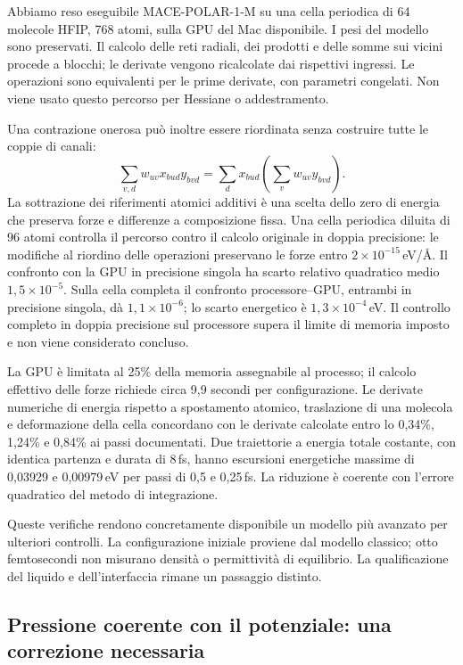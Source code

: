 \documentclass[11pt,reqno]{amsart}
\numberwithin{equation}{section}
\begin{document}
Abbiamo reso eseguibile MACE-POLAR-1-M su una cella periodica
di 64 molecole HFIP, 768 atomi, sulla GPU del Mac disponibile.
I pesi del modello sono preservati. Il calcolo delle reti radiali,
dei prodotti e delle somme sui vicini procede a blocchi;
le derivate vengono ricalcolate dai rispettivi ingressi.
Le operazioni sono equivalenti per le prime derivate, con
parametri congelati. Non viene usato questo percorso per Hessiane
o addestramento.

Una contrazione onerosa pu\`o inoltre essere riordinata senza
costruire tutte le coppie di canali:
\begin{equation}
 \sum_{v,d}w_{uv}x_{bud}y_{bvd}
 =\sum_d x_{bud}\left(\sum_v w_{uv}y_{bvd}\right).
\end{equation}
La sottrazione dei riferimenti atomici additivi \`e una scelta
dello zero di energia che preserva forze e differenze a composizione
fissa. Una cella periodica diluita di 96 atomi controlla il percorso
contro il calcolo originale in doppia precisione: le modifiche
al riordino delle operazioni preservano le forze entro
$2\times10^{-15}$\,eV/\AA. Il confronto con la GPU in precisione singola
ha scarto relativo quadratico medio $1{,}5\times10^{-5}$.
Sulla cella completa il confronto processore--GPU, entrambi in
precisione singola, d\`a $1{,}1\times10^{-6}$; lo scarto energetico
\`e $1{,}3\times10^{-4}$\,eV. Il controllo completo in doppia
precisione sul processore supera il limite di memoria imposto
e non viene considerato concluso.

La GPU \`e limitata al 25\% della memoria assegnabile al processo;
il calcolo effettivo delle forze richiede circa 9,9 secondi
per configurazione. Le derivate numeriche di energia rispetto
a spostamento atomico, traslazione di una molecola e deformazione
della cella concordano con le derivate calcolate entro lo 0,34\%,
1,24\% e 0,84\% ai passi documentati. Due traiettorie a energia
totale costante, con identica partenza e durata di 8\,fs, hanno
escursioni energetiche massime di 0,03929 e 0,00979\,eV per
passi di 0,5 e 0,25\,fs. La riduzione \`e coerente con l'errore
quadratico del metodo di integrazione.

Queste verifiche rendono concretamente disponibile un modello
pi\`u avanzato per ulteriori controlli. La configurazione iniziale
proviene dal modello classico; otto femtosecondi non misurano
densit\`a o permittivit\`a di equilibrio. La qualificazione del
liquido e dell'interfaccia rimane un passaggio distinto.

\subsection{Pressione coerente con il potenziale: una correzione necessaria}
\end{document}
